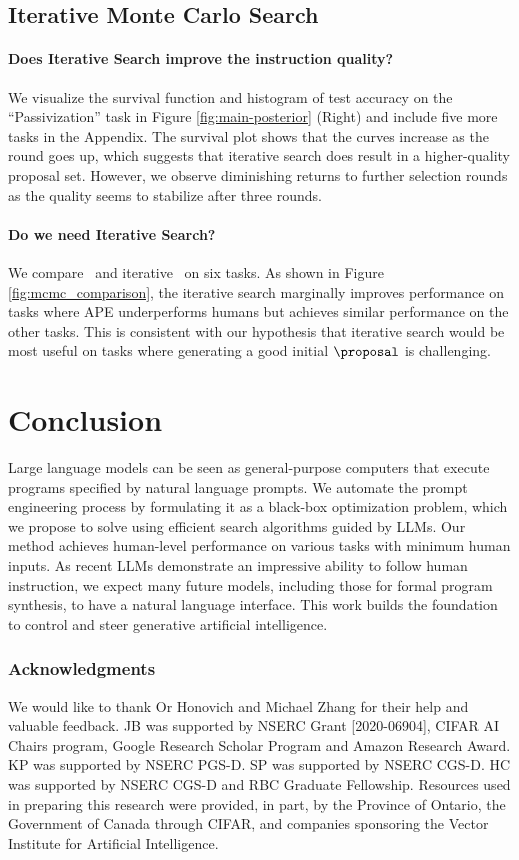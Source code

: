 \subsection{Iterative Monte Carlo Search}\label{ab:tmcs}
\paragraph{Does Iterative Search improve the instruction quality?} We visualize the survival function and histogram of test accuracy on the ``Passivization'' task in Figure \ref{fig:main-posterior} (Right) and include five more tasks in the Appendix. The survival plot shows that the curves increase as the round goes up, which suggests that iterative search does result in a higher-quality proposal set. However, we observe diminishing returns to further selection rounds as the quality seems to stabilize after three rounds.

\paragraph{Do we need Iterative Search?}
We compare \algname~and iterative \algname~on six tasks. As shown in Figure \ref{fig:mcmc_comparison}, the iterative search marginally improves performance on tasks where APE underperforms humans but achieves similar performance on the other tasks. This is consistent with our hypothesis that iterative search would be most useful on tasks where generating a good initial $\proposal$ is challenging.
\section{Conclusion}
Large language models can be seen as general-purpose computers that execute programs specified by natural language prompts. We automate the prompt engineering process by formulating it as a black-box optimization problem, which we propose to solve using efficient search algorithms guided by LLMs. Our method achieves human-level performance on various tasks with minimum human inputs. As recent LLMs demonstrate an impressive ability to follow human instruction, we expect many future models, including those for formal program synthesis, to have a natural language interface. This work builds the foundation to control and steer generative artificial intelligence.

\subsubsection*{Acknowledgments}
We would like to thank Or Honovich and Michael Zhang for their help and valuable feedback. JB was supported by NSERC Grant [2020-06904], CIFAR AI Chairs program, Google Research Scholar Program and Amazon Research Award. KP was supported by NSERC PGS-D. SP was supported by NSERC CGS-D. HC was supported by NSERC CGS-D and RBC Graduate Fellowship. Resources used in preparing this research were provided, in part, by the Province of Ontario, the Government of Canada through CIFAR, and companies sponsoring the Vector Institute for Artificial Intelligence.

\newpage

